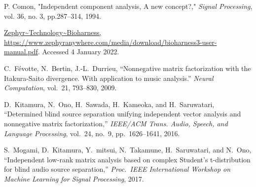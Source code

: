 \documentclass[a4j]{jsarticle}
\begin{document}
\begin{thebibliography}{99}%
\itemsep 3pt %
\fontsize{8pt}{10pt}\selectfont  %

P. Comon, "Independent component analysis, A new concept?," {\em Signal Processing}, vol. 36, no. 3, pp.287--314, 1994.

\url{Zephyr~Technology~Bioharness, https://www.zephyranywhere.com/media/download/bioharness3-user-manual.pdf}. Accessed 4 January 2022.

C.~Févotte, N.~Bertin, J.-L.~Durrieu, 
``Nonnegative matrix factorization with the Itakura-Saito divergence. With application to music analysis.'' 
{\em Neural Computation}, vol.~21, 793--830, 2009.

D.~Kitamura, N.~Ono, H.~Sawada, H.~Kameoka, and H.~Saruwatari,
``Determined blind source separation unifying independent vector analysis and nonnegative matrix factorization,'' 
{\em IEEE/ACM Trans. Audio, Speech, and Language Processing}, vol.~24, no.~9, pp.~1626--1641, 2016.

S.~Mogami, D.~Kitamura, Y.~mitsui, N.~Takamune, H.~Saruwatari, and N.~Ono, ``Independent low-rank matrix analysis based on complex Student's t-distribution for blind audio source     separation,''
{\em Proc.~IEEE International Workshop on Machine Learning for Signal Processing}, 2017. 

\end{thebibliography}
\end{document}
